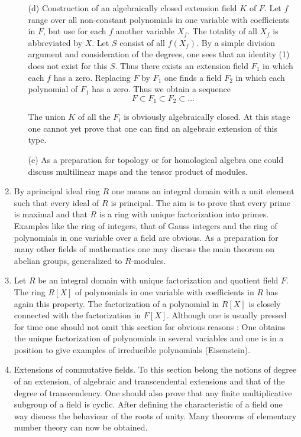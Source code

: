 \begin{enumerate}[(1)]
\begin{itemize}
\item[(d)] Construction of an algebraically closed extension field $K$
  of $F$. Let $f$ range over all non-constant polynomials in one
  variable with coefficients in $F$, but use for each $f$ another
  variable $X_f$. The totality of all $X_f$ is abbreviated by $X$. Let
  $S$ consist of all $f(X_f)$. By a simple division argument and
  consideration of the degrees, one sees that an identity (1) does not
  exist for this $S$. Thus there exists an extension field $F_1$ in
  which each $f$ has a zero. Replacing $F$ by $F_1$ one finds a field
  $F_2$ in which each polynomial of $F_1$ has a zero. Thus we obtain a sequence
$$
F \subset F_1 \subset F_2 \subset \ldots
$$

The union $K$ of all the $F_i$ is obviously algebraically closed. At
this stage one cannot yet prove that one can find an algebraic
extension of this type.

\item[(e)] As a preparation for topology or for homological algebra
  one could discuss multilinear maps and the tensor product of modules.
\end{itemize}

\item By a\pageoriginale principal ideal ring $R$ one means an
  integral domain with a unit element such that every ideal of $R$ is
  principal. The aim is to prove that every prime is maximal and that
  $R$ is a ring with unique factorization into primes. Examples like
  the ring of integers, that of Gauss integers and the ring of
  polynomials in one variable over a field are obvious. As a
  preparation for many other fields of mathematics one may discuss the
  main theorem on abelian groups, generalized to $R$-modules.

\item Let $R$ be an integral domain with unique factorization and
  quotient field $F$. The ring $R[X]$ of polynomials in one variable
  with coefficients in $R$ has again this property. The factorization
  of a polynomial in $R[X]$ is closely connected with the
  factorization in $F[X]$. Although one is usually pressed for time
  one should not omit this section for obvious reasons : One obtains
  the unique factorization of polynomials in several variables and one
  is in  a position to give examples of irreducible polynomials (Eisenstein).

\item Extensions of commutative fields. To this section belong the
  notions of degree of an extension, of algebraic and transcendental
  extensions and that of the degree of transcendency. One should also
  prove that any finite multiplicative subgroup of a field is
  cyclic. After defining  the characteristic of a field one way
  disucss the behaviour of the roots of unity. Many theorems of
  elementary number theory can now be obtained. 


\end{enumerate}
